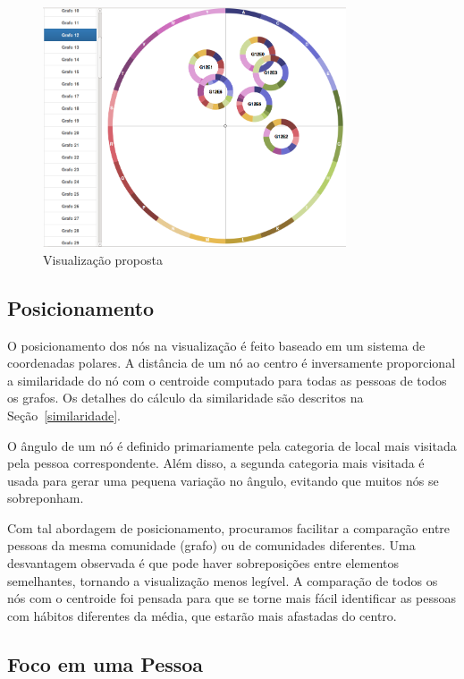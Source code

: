 \documentclass[12pt]{article}
\begin{document}
\begin{figure}[h!]
  \caption{Visualização proposta}
  \centering
  \includegraphics[width=0.8\textwidth]{visualizacao.png}
\end{figure}


\subsection{Posicionamento}
\label{posicionamento}

O posicionamento dos nós na visualização é feito baseado em um sistema de coordenadas polares. A distância de um nó ao centro é inversamente proporcional a similaridade do nó com o centroide computado para todas as pessoas de todos os grafos. Os detalhes do cálculo da similaridade são descritos na Seção~\ref{similaridade}.

O ângulo de um nó é definido primariamente pela categoria de local mais visitada pela pessoa correspondente. Além disso, a segunda categoria mais visitada é usada para gerar uma pequena variação no ângulo, evitando que muitos nós se sobreponham.

Com tal abordagem de posicionamento, procuramos facilitar a comparação entre pessoas da mesma comunidade (grafo) ou de comunidades diferentes. Uma desvantagem observada é que pode haver sobreposições entre elementos semelhantes, tornando a visualização menos legível. A comparação de todos os nós com o centroide foi pensada para que se torne mais fácil identificar as pessoas com hábitos diferentes da média, que estarão mais afastadas do centro.

\subsection{Foco em uma Pessoa}
\end{document}
